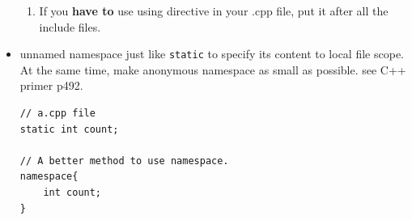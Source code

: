 \documentclass[a4paper,11pt,twoside]{book}
\begin{document}
\begin{itemize}
\begin{enumerate}
		\item If you \textbf{have to} use using directive in your .cpp file, put it after all the include files.
	\end{enumerate}
	
	\item unnamed namespace just like \texttt{static} to specify its content to local file scope. At the same time, make anonymous namespace as small as possible.  see C++ primer p492.
	
\begin{lstlisting}[numbers=none]
// a.cpp file
static int count;
	
// A better method to use namespace.
namespace{
	int count;
}
\end{lstlisting}
	
\end{itemize}
\end{document}
